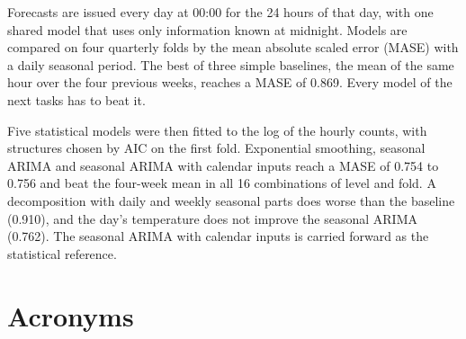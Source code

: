 \documentclass[12pt,a4paper,openany]{report}
\begin{document}
Forecasts are issued every day at 00:00 for the 24 hours of that day, with one shared model that uses only
information known at midnight. Models are compared on four quarterly folds by the mean absolute scaled error (MASE)
with a daily seasonal period. The best of three simple baselines, the mean of the same hour over the four previous weeks, reaches a
MASE of 0.869. Every model of the next tasks has to beat it.

Five statistical models were then fitted to the log of the hourly counts, with structures chosen by AIC on the first
fold. Exponential smoothing, seasonal ARIMA and seasonal ARIMA with calendar inputs reach a MASE of 0.754 to 0.756
and beat the four-week mean in all 16 combinations of level and fold. A decomposition with daily and weekly seasonal
parts does worse than the baseline (0.910), and the day's temperature does not improve the seasonal ARIMA (0.762).
The seasonal ARIMA with calendar inputs is carried forward as the statistical reference.

\tableofcontents
\listoffigures
\listoftables

\chapter*{Acronyms}
\begin{acronym}[SARIMAX]
\end{acronym}

\cleardoublepage
{}

\makeatletter
{}
\renewcommand{\@makechapterhead}[1]{{\parindent\z@\raggedright\normalfont
  \LARGE\bfseries\thechapter\quad #1\par\nobreak\vskip 12\p@}}
\makeatother
\end{document}
